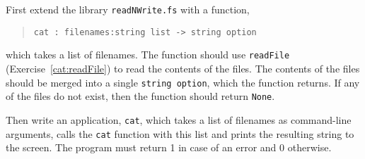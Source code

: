 First extend the library \lstinline{readNWrite.fs} with a function,
\begin{quote}
  \mbox{\lstinline!cat : filenames:string list -> string option!}
\end{quote}
which takes a list of filenames. The function should use
\lstinline{readFile} (Exercise~\ref{cat:readFile}) to read the
contents of the files. The contents of the files should be merged into
a single \lstinline{string option}, which the function returns. If any of the
files do not exist, then the function should return \lstinline{None}.

Then write an application, \lstinline[language=console]{cat}, which takes a
list of filenames as command-line arguments, calls the \lstinline{cat}
function with this list and prints the resulting string to the screen. The
program must return 1 in case of an error and 0 otherwise.